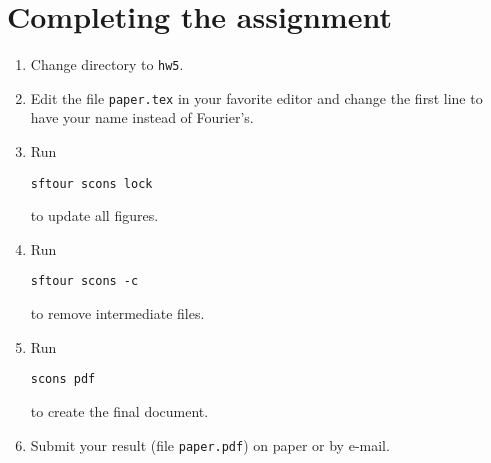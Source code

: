 \newpage

\section{Completing the assignment}

\begin{enumerate}
\item Change directory to \texttt{hw5}.
\item Edit the file \texttt{paper.tex} in your favorite editor and change the first line to have your name instead of Fourier's.
\item Run
\begin{verbatim}
sftour scons lock
\end{verbatim}
to update all figures.
\item Run
\begin{verbatim}
sftour scons -c
\end{verbatim}
to remove intermediate files.
\item Run
\begin{verbatim} 
scons pdf
\end{verbatim}
to create the final document.
\item Submit your result (file \texttt{paper.pdf}) on paper or by
  e-mail. 
\end{enumerate}
